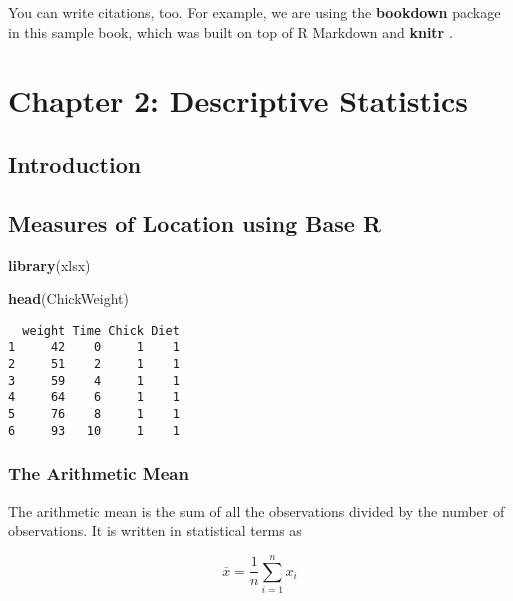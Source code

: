 \documentclass[]{book}
\newenvironment{Shaded}{\begin{snugshade}}{\end{snugshade}}
\newcommand{\KeywordTok}[1]{\textcolor[rgb]{0.13,0.29,0.53}{\textbf{#1}}}
\newcommand{\OperatorTok}[1]{\textcolor[rgb]{0.81,0.36,0.00}{\textbf{#1}}}
\newcommand{\NormalTok}[1]{#1}
\theoremstyle{definition}
\theoremstyle{definition}
\theoremstyle{definition}
\theoremstyle{remark}
\begin{document}
You can write citations, too. For example, we are using the
\textbf{bookdown} package \citep{R-bookdown} in this sample book, which
was built on top of R Markdown and \textbf{knitr} \citep{xie2015}.

\chapter{Chapter 2: Descriptive
Statistics}\label{chapter-2-descriptive-statistics}

\section{Introduction}\label{introduction}

\section{Measures of Location using Base
R}\label{measures-of-location-using-base-r}

\begin{Shaded}
\begin{Highlighting}[]
\KeywordTok{library}\NormalTok{(xlsx)}

\KeywordTok{head}\NormalTok{(ChickWeight)}
\end{Highlighting}
\end{Shaded}

\begin{verbatim}
  weight Time Chick Diet
1     42    0     1    1
2     51    2     1    1
3     59    4     1    1
4     64    6     1    1
5     76    8     1    1
6     93   10     1    1
\end{verbatim}

\subsection{The Arithmetic Mean}\label{the-arithmetic-mean}

The arithmetic mean is the sum of all the observations divided by the
number of observations. It is written in statistical terms as

\[\overline{x} = \frac{1}{n}\sum^n_{i=1}x_i\]

\begin{Shaded}
\end{Shaded}
\end{document}
